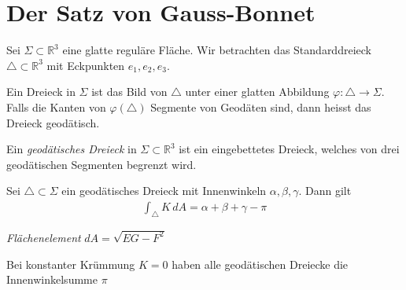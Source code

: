 \documentclass[../main.tex]{subfiles}
\begin{document}
\section{Der Satz von Gauss-Bonnet}
\begin{minipage}{30em}
    Sei $\Sigma \subset \mathbb{R}^3$ eine glatte reguläre Fläche. Wir betrachten das Standarddreieck $\triangle \subset \mathbb{R}^3$ mit Eckpunkten $e_1,e_2,e_3$.
\end{minipage}
\begin{minipage}{8em}
\end{minipage}

Ein Dreieck in $\Sigma$ ist das Bild von $\triangle$ unter einer glatten Abbildung $\varphi : \triangle \to \Sigma$.
Falls die Kanten von $\varphi (\triangle)$ Segmente von Geodäten sind, dann heisst das Dreieck geodätisch.

\begin{definition}
    Ein \emph{geodätisches Dreieck} in $\Sigma \subset \mathbb{R}^3$ ist ein eingebettetes Dreieck, welches von drei geodätischen Segmenten begrenzt wird.
\end{definition}

\begin{theorem}
    Sei $\triangle \subset \Sigma$ ein geodätisches Dreieck mit Innenwinkeln $\alpha, \beta, \gamma$. Dann gilt
    \begin{align*}
        \int_{\triangle} K \,dA = \alpha + \beta + \gamma - \pi 
    \end{align*}
\end{theorem}
 
\begin{recall}
    \emph{Flächenelement} $dA = \sqrt{EG-F^{2}}$ 
\end{recall}

\begin{remark}
    Bei konstanter Krümmung $K = 0$ haben alle geodätischen Dreiecke die Innenwinkelsumme $\pi$
\end{remark}

\begin{geometric}
\end{geometric}
\end{document}
